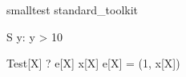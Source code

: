 \begin{zsection}
\SECTION smalltest \parents standard\_toolkit
\end{zsection}

\begin{schema}{S}
   y: \nat
\where
   y > 10
\end{schema}



\begin{theorem}{Test}[X]
   \vdash? e[X] \in \langle x[X] \rangle  \iff  e[X] = (1, x[X])
\end{theorem}